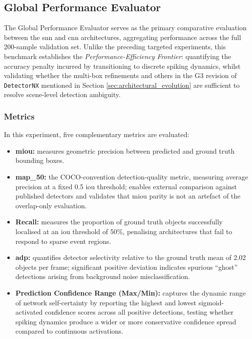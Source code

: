 \subsection{Global Performance Evaluator}
\label{subsec:global_evaluator}

The Global Performance Evaluator serves as the primary comparative evaluation between the \gls{snn} and \gls{cnn} architectures,
aggregating performance across the full 200-sample validation set.
Unlike the preceding targeted experiments, this benchmark establishes the \textit{Performance-Efficiency Frontier}:
quantifying the accuracy penalty incurred by transitioning to discrete spiking dynamics, whilst validating whether the multi-box refinements and others in the G3 revision of \texttt{DetectorNX}
mentioned in Section \ref{sec:architectural_evolution} are sufficient to resolve scene-level detection ambiguity.

\subsubsection{Metrics}

In this experiment, five complementary metrics are evaluated:

\begin{itemize}
    \item \textbf{\gls{miou}:} measures geometric precision between predicted and ground truth bounding boxes.

    \item \textbf{\gls{map_50}:} the COCO-convention detection-quality metric, measuring average precision at a fixed 0.5 \gls{iou} threshold; enables external comparison against published detectors and validates that \gls{miou} parity is not an artefact of the overlap-only evaluation.

    \item \textbf{Recall:}
    measures the proportion of ground truth objects successfully localised at an \gls{iou} threshold of 50\%, penalising architectures that fail to respond to
    sparse event regions.

    \item \textbf{\gls{adp}:} 
    quantifies detector selectivity relative to the ground truth mean of 2.02 objects per frame;
    significant positive deviation indicates spurious ``ghost'' detections arising from background noise misclassification.

    \item \textbf{Prediction Confidence Range (Max/Min):}
    captures the dynamic range of network self-certainty by reporting the highest and lowest sigmoid-activated confidence scores across all positive detections, 
    testing whether spiking dynamics produce a wider or more conservative confidence spread compared to continuous activations.
\end{itemize}

